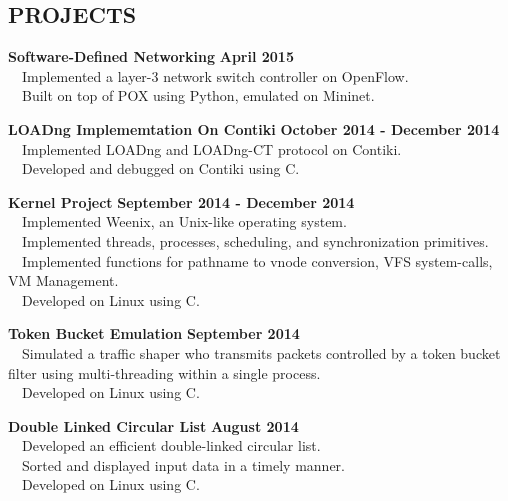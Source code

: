 \documentclass[margin,line]{resume}
\begin{document}
\begin{resume}
\sectionline

    \section{\mysidestyle \textbf{\large{P}\small{ROJECTS}}}

    \textbf{\listing Software-Defined Networking} \hfill \textbf{April 2015}\vspace{2mm}\\
    \textbullet \ \ Implemented a layer-3 network switch controller on OpenFlow.\\
    \textbullet \ \ Built on top of POX using Python, emulated on Mininet.   

    \textbf{\listing LOADng Implememtation On Contiki} \hfill \textbf{October 2014 - December 2014}\vspace{1mm}\\
    \textbullet \ \ Implemented LOADng and LOADng-CT protocol on Contiki.\\
    \textbullet \ \ Developed and debugged on Contiki using C.  

    \textbf{\listing Kernel Project} \hfill \textbf{September 2014 - December 2014}\vspace{2mm}\\
    \textbullet \ \ Implemented Weenix, an Unix-like operating system.\\
	\textbullet \ \ Implemented threads, processes, scheduling, and synchronization primitives.\\
	\textbullet \ \ Implemented functions for pathname to vnode conversion, VFS system-calls, VM Management.\\
	\textbullet \ \ Developed on Linux using C. 

    \textbf{\listing Token Bucket Emulation} \hfill \textbf{September 2014}\vspace{2mm}\\
    \textbullet \ \ Simulated a traffic shaper who transmits packets controlled by a token bucket filter using multi-threading within a single process.\\
    \textbullet \ \ Developed on Linux using C.    

    \textbf{\listing Double Linked Circular List} \hfill \textbf{August 2014}\vspace{2mm}\\
    \textbullet \ \ Developed an efficient double-linked circular list.\\
    \textbullet \ \ Sorted and displayed input data in a timely manner.\\
    \textbullet \ \ Developed on Linux using C.


\end{resume}
\end{document}
